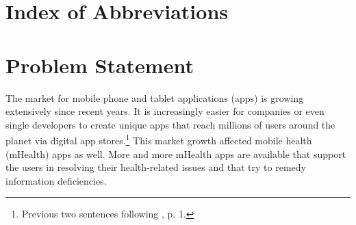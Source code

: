 \documentclass[
	a4paper,
	oneside,
	12pt,
	liststotocnumbered
]{article}
\let\cite\textcite
\begin{document}
\renewcommand{\figurename}{Figure}
\renewcommand{\tablename}{Table}
\renewcommand\thefigure{\arabic{section}-\arabic{figure}}
\renewcommand\thetable{Tab. \arabic{section}-\arabic{table}}
\newcommand{\todo}[1]{\textbf{\textsc{\textcolor{red}{TODO: #1}}}}

\newcommand{\mH}{mHealth }
\newcommand{\ap}{app provider }
\newcommand{\pp}{privacy policy }
\newcommand{\pps}{privacy policies }
\newcommand{\sca}{static code analysis }
\newcommand{\Sca}{Static code analysis }
\newcommand{\pra}{privacy risk assessment }
\newcommand{\prfs}{privacy risk factors }




\tableofcontents
\newpage

\section*{Index of Abbreviations}
\begin{acronym}[TTTTTTTTTTTTTTTTTTTT]
\end{acronym}
\newpage

\normalsize
{}

\section{Problem Statement}
The market for mobile phone and tablet applications (apps) is growing extensively since recent years.
It is increasingly easier for companies or even single developers to create unique apps that reach millions of users around the planet via digital app stores.\footnote{Previous two sentences following \cite{Enck2011}, p. 1.}
This market growth affected mobile health (\acs{mHealth}) apps as well. 
More and more \mH apps are available that support the users in resolving their health-related issues and that try to remedy information deficiencies. 
\end{document}
